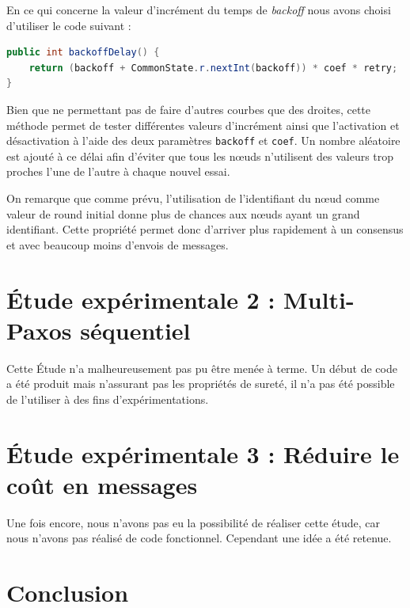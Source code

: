 \documentclass[french]{article}
\begin{document}
En ce qui concerne la valeur d'incrément du temps de \emph{backoff} nous avons choisi d'utiliser le code suivant :

\begin{lstlisting}[language=java]
public int backoffDelay() {
	return (backoff + CommonState.r.nextInt(backoff)) * coef * retry;
}
\end{lstlisting}

Bien que ne permettant pas de faire d'autres courbes que des droites, cette méthode permet de tester différentes valeurs d'incrément ainsi que l'activation et désactivation à l'aide des deux paramètres \lstinline{backoff} et \lstinline{coef}.
Un nombre aléatoire est ajouté à ce délai afin d'éviter que tous les nœuds n'utilisent des valeurs trop proches l'une de l'autre à chaque nouvel essai.



On remarque que comme prévu, l'utilisation de l'identifiant du nœud comme valeur de round initial donne plus de chances aux nœuds ayant un grand identifiant.
Cette propriété permet donc d'arriver plus rapidement à un consensus et avec beaucoup moins d'envois de messages.





\section{Étude expérimentale 2 : Multi-Paxos séquentiel}

Cette Étude n'a malheureusement pas pu être menée à terme.
Un début de code a été produit mais n'assurant pas les propriétés de sureté, il n'a pas été possible de l'utiliser à des fins d'expérimentations.

\section{Étude expérimentale 3 : Réduire le coût en messages}

Une fois encore, nous n'avons pas eu la possibilité de réaliser cette étude, car nous n'avons pas réalisé de code fonctionnel.
Cependant une idée a été retenue.

\section*{Conclusion}
\end{document}
